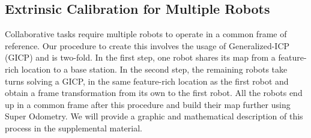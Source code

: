 \documentclass[10pt,twocolumn,letterpaper]{article}
\begin{document}

\subsection{Extrinsic Calibration for Multiple Robots}\label{sec:extrinsic_calib_robots}
Collaborative tasks require multiple robots to operate in a common frame of reference. Our procedure to create this involves the usage of Generalized-ICP (GICP)\cite{segal2009generalized} and is two-fold. In the first step, one robot shares its map from a feature-rich location to a base station. In the second step, the remaining robots take turns solving a GICP, in the same feature-rich location as the first robot and obtain a frame transformation from its own to the first robot. All the robots end up in a common frame after this procedure and build their map further using Super Odometry\cite{zhao2021super}. We will provide a graphic and mathematical description of this process in the supplemental material.


\end{document}
